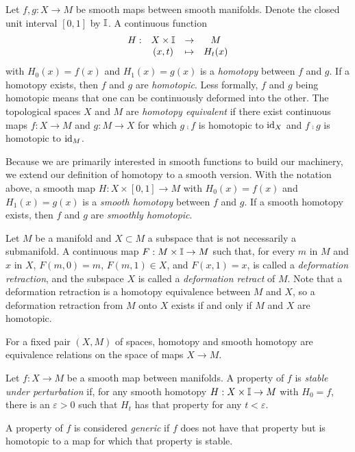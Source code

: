 \begin{defn}[Homotopy]
	\label{def:homotopy}
	Let $f,g:X\to M$ be smooth maps between smooth manifolds.
	Denote the closed unit interval $[0,1]$ by $\mathbb{I}$.
	A continuous function 
	\[
		\begin{array}{cccc}
			H: & X\times \mathbb{I} & \to & M \\
			& (x,t)	& \mapsto & H_t(x)
		\end{array}
	\]
	with $H_0(x)=f(x)$ and $H_1(x)=g(x)$ is a \emph{homotopy} between $f$ and $g$.
	If a homotopy exists, then $f$ and $g$ are \emph{homotopic}.
	Less formally, $f$ and $g$ being homotopic means that one can be continuously deformed into the other.
	The topological spaces $X$ and $M$ are \emph{homotopy equivalent} if there exist continuous maps $f:X\to M$ and $g:M\to X$ for which $g\comp f$ is homotopic to $\textrm{id}_{X}$ and $f\comp g$ is homotopic to $\textrm{id}_{M}$.
	
	Because we are primarily interested in smooth functions to build our machinery, we extend our definition of homotopy to a smooth version.
	With the notation above, a smooth map $H:X\times[0,1]\to M$ with $H_0(x)=f(x)$ and $H_1(x)=g(x)$ is a \emph{smooth homotopy} between $f$ and $g$.
	If a smooth homotopy exists, then $f$ and $g$ are \emph{smoothly homotopic}.
	
	Let $M$ be a manifold and $X\subset M$ a subspace that is not necessarily a submanifold.
	A continuous map $F:M\times\mathbb{I}\to M$ such that, for every $m$ in $M$ and $x$ in $X$, $F(m,0)=m$, $F(m,1)\in X$, and $F(x,1)=x$, is called a \emph{deformation retraction}, and the subspace $X$ is called a \emph{deformation retract} of $M$.
	Note that a deformation retraction is a homotopy equivalence between $M$ and $X$, so a deformation retraction from $M$ onto $X$ exists if and only if $M$ and $X$ are homotopic.
\end{defn}

\begin{prop}
	For a fixed pair $(X,M)$ of spaces, homotopy and smooth homotopy are equivalence relations on the space of maps $X\to M$.
\end{prop}

\begin{defn}
	Let $f:X\to M$ be a smooth map between manifolds.
	A property of $f$ is \emph{stable under perturbation} if, for any smooth homotopy $H:X\times \mathbb{I}\to M$ with $H_0=f$, there is an $\varepsilon>0$ such that $H_t$ has that property for any $t<\varepsilon$.
	
	A property of $f$ is considered \emph{generic} if $f$ does not have that property but is homotopic to a map for which that property is stable.
\end{defn}

